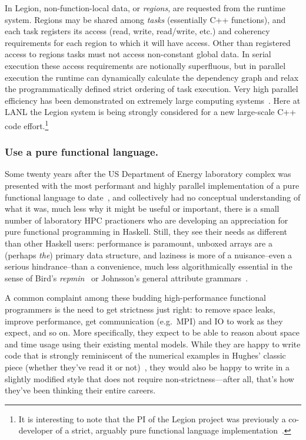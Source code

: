 \documentclass{llncs}
\begin{document}
In Legion, non-function-local data, or \emph{regions}, are requested from the
runtime system.  Regions may be shared among \emph{tasks} (essentially C++
functions), and each task registers its access (read, write, read/write, etc.)
and coherency requirements for each region to which it will have access.
Other than registered access to regions tasks must not access non-constant
global data.  In serial execution these access requirements are notionally
superfluous, but in parallel execution the runtime can dynamically calculate
the dependency graph and relax the programmatically defined strict ordering of
task execution.  Very high parallel efficiency has been demonstrated on extremely
large computing systems~\cite{Bauer14}.  Here at LANL the Legion system is
being strongly considered for a new large-scale C++ code effort.\footnote{
It is interesting to note that the PI of the Legion project was previously a
co-developer of a strict, arguably pure functional language
implementation~\cite{AikenFL}.}

\subsubsection{Use a pure functional language.}
Some twenty years after the US Department of Energy laboratory complex was
presented with the most performant and highly parallel implementation of a
pure functional language to date~\cite{Davis96}, and collectively had no
conceptual understanding of what it was, much less why it might be useful or
important, there is a small number of laboratory HPC practioners who are
developing an appreciation for pure functional programming in Haskell.  Still,
they see their needs as different than other Haskell users: performance is
paramount, unboxed arrays are a (perhaps \emph{the}) primary data structure,
and laziness is more of a nuisance--even a serious hindrance--than a
convenience, much less algorithmically essential in the sense of Bird's
\emph{repmin}~\cite{Bird84} or Johnsson's general attribute
grammars~\cite{Johnsson87}.

A common complaint among these budding high-performance functional programmers
is the need to get strictness just right: to remove space leaks,
improve performance, get communication (e.g.\ MPI) and IO to work as they
expect, and so on.  More specifically, they expect to be able to reason about
space and time usage using their existing mental models. While they are
happy to write code that is strongly reminiscent of the numerical examples in
Hughes' classic piece (whether they've read it or not)~\cite{Hughes89},
they would also be happy to write in a slightly modified style that does
not require non-strictness---after all, that's how they've been thinking their
entire careers.
\end{document}
